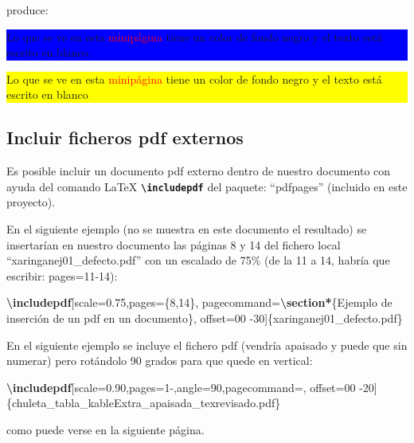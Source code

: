 \documentclass[12pt,a4paper,]{book}
\newenvironment{Shaded}{\begin{snugshade}}{\end{snugshade}}
\newcommand{\FunctionTok}[1]{\textcolor[rgb]{0.13,0.29,0.53}{\textbf{#1}}}
\newcommand{\KeywordTok}[1]{\textcolor[rgb]{0.13,0.29,0.53}{\textbf{#1}}}
\newcommand{\NormalTok}[1]{#1}
\numberwithin{dummy}{section}
\theoremstyle{ocrenumbox}
\theoremstyle{blacknumex}
\theoremstyle{blacknumbox}
\theoremstyle{ocrenum}
\theoremstyle{ocrenum}
\begin{document}
produce:

\noindent

\colorbox{blue}{
\begin{minipage}{0.30\textwidth}
\color{white}
Lo que se ve en esta \textcolor{red}{minipágina} 
tiene un color de fondo negro y
el texto está escrito en blanco. 
\end{minipage}}\hspace{0.5cm} 
\colorbox{yellow}{\begin{minipage}{0.60\textwidth} 
Lo que se ve en esta \textcolor{red}{minipágina} 
tiene un color de fondo negro y
el texto está escrito en blanco
\end{minipage}}

\texttt{}

\hypertarget{incluir-ficheros-pdf-externos}{%
\subsection{Incluir ficheros pdf
externos}\label{incluir-ficheros-pdf-externos}}

Es posible incluir un documento pdf externo dentro de nuestro documento
con ayuda del comando LaTeX \textbf{\texttt{\textbackslash{}includepdf}}
del paquete: ``pdfpages'' (incluido en este proyecto).

En el siguiente ejemplo (no se muestra en este documento el resultado)
se insertarían en nuestro documento las páginas 8 y 14 del fichero local
``xaringanej01\_defecto.pdf'' con un escalado de 75\% (de la 11 a 14,
habría que escribir: pages=11-14):

\begin{Shaded}
\begin{Highlighting}[]
\FunctionTok{\textbackslash{}includepdf}\NormalTok{[scale=0.75,pages=\{8,14\}, }
\NormalTok{  pagecommand=}\KeywordTok{\textbackslash{}section*}\NormalTok{\{Ejemplo de inserción de un pdf en un documento\}, }
\NormalTok{  offset=00 {-}30]\{xaringanej01\_defecto.pdf\}}
\end{Highlighting}
\end{Shaded}

En el siguiente ejemplo se incluye el fichero pdf (vendría apaisado y
puede que sin numerar) pero rotándolo 90 grados para que quede en
vertical:

\begin{Shaded}
\begin{Highlighting}[]
\FunctionTok{\textbackslash{}includepdf}\NormalTok{[scale=0.90,pages=1{-},angle=90,pagecommand=,}
\NormalTok{offset=00 {-}20]\{chuleta\_tabla\_kableExtra\_apaisada\_texrevisado.pdf\}}
\end{Highlighting}
\end{Shaded}

como puede verse en la siguiente página.






\end{document}
